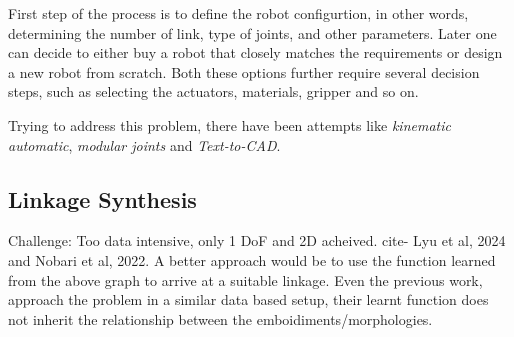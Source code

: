 



First step of the process is to define the robot configurtion, in other words, determining the number of link, type of joints, and other parameters. Later one can decide to either buy a robot that closely matches the requirements or design a new robot from scratch. Both these options further require several decision steps, such as selecting the actuators, materials, gripper and so on.
    
Trying to address this problem, there have been attempts like \textit{kinematic automatic}, \textit{modular joints} and \textit{Text-to-CAD}.


\subsection{Linkage Synthesis}
Challenge: Too data intensive, only 1 DoF and 2D acheived. cite- Lyu et al, 2024 and Nobari et al, 2022.
A better approach would be to use the function learned from the above graph to arrive at a suitable linkage.
Even the previous work, approach the problem in a similar data based setup, their learnt function does not inherit the relationship between the emboidiments/morphologies.




